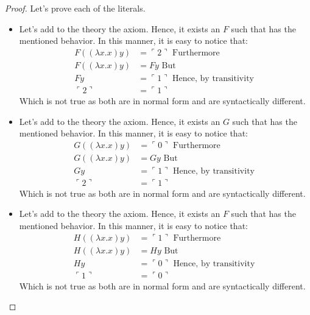 \documentclass[11pt]{article}
\theoremstyle{definition}
\theoremstyle{remark}
\theoremstyle{remark}
\theoremstyle{definition}
\newcommand{\ch}[1]{\ulcorner #1 \urcorner}
\begin{document}
\begin{proof}
  Let's prove each of the literals.
  \begin{itemize}
    \item Let's add to the theory the axiom. Hence, it exists an $F$ such that
          has the mentioned behavior. In this manner, it is easy to notice that:
          \begin{align*}
            F((\lambda x. x)y) &= \ch{2} \text{ Furthermore}\\
            F((\lambda x. x)y) &= Fy \text{ But }\\
            Fy &= \ch{1} \text{ Hence, by transitivity }\\
            \ch{2} &= \ch{1}
          \end{align*}
          Which is not true as both are in normal form and are syntactically
          different.

    \item Let's add to the theory the axiom. Hence, it exists an $G$ such that
          has the mentioned behavior. In this manner, it is easy to notice that:
          \begin{align*}
            G((\lambda x. x)y) &= \ch{0} \text{ Furthermore}\\
            G((\lambda x. x)y) &= Gy \text{ But }\\
            Gy &= \ch{1} \text{ Hence, by transitivity }\\
            \ch{2} &= \ch{1}
          \end{align*}
          Which is not true as both are in normal form and are syntactically
          different.

    \item Let's add to the theory the axiom. Hence, it exists an $F$ such that
          has the mentioned behavior. In this manner, it is easy to notice that:
          \begin{align*}
            H((\lambda x. x)y) &= \ch{1} \text{ Furthermore}\\
            H((\lambda x. x)y) &= Hy \text{ But }\\
            Hy &= \ch{0} \text{ Hence, by transitivity }\\
            \ch{1} &= \ch{0}
          \end{align*}
          Which is not true as both are in normal form and are syntactically
          different.
  \end{itemize}
\end{proof}
\end{document}
